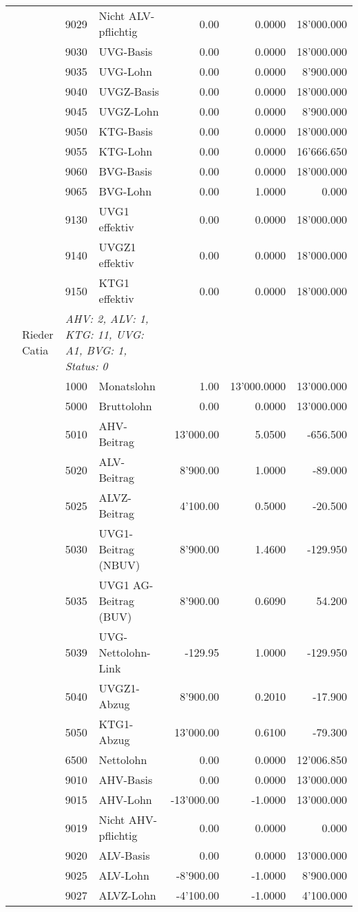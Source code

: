 \documentclass[15pt,a4paper]{article}
\begin{document}
\begin{longtable}{@{\extracolsep{\fill}}l l l l|r|r|r}
&&9029&Nicht ALV-pflichtig&0.00&0.0000&18'000.000\\
&&9030&UVG-Basis&0.00&0.0000&18'000.000\\
&&9035&UVG-Lohn&0.00&0.0000&8'900.000\\
&&9040&UVGZ-Basis&0.00&0.0000&18'000.000\\
&&9045&UVGZ-Lohn&0.00&0.0000&8'900.000\\
&&9050&KTG-Basis&0.00&0.0000&18'000.000\\
&&9055&KTG-Lohn&0.00&0.0000&16'666.650\\
&&9060&BVG-Basis&0.00&0.0000&18'000.000\\
&&9065&BVG-Lohn&0.00&1.0000&0.000\\
&&9130&UVG1 effektiv&0.00&0.0000&18'000.000\\
&&9140&UVGZ1 effektiv&0.00&0.0000&18'000.000\\
&&9150&KTG1 effektiv&0.00&0.0000&18'000.000\\
\pagebreak
23&Rieder Catia&\multicolumn{2}{l|}{\small\emph{AHV: 2, ALV: 1, KTG: 11, UVG: A1, BVG: 1, Status: 0}}&& \\
&&1000&Monatslohn&1.00&13'000.0000&13'000.000\\
&&5000&Bruttolohn&0.00&0.0000&13'000.000\\
&&5010&AHV-Beitrag&13'000.00&5.0500&-656.500\\
&&5020&ALV-Beitrag&8'900.00&1.0000&-89.000\\
&&5025&ALVZ-Beitrag&4'100.00&0.5000&-20.500\\
&&5030&UVG1-Beitrag (NBUV)&8'900.00&1.4600&-129.950\\
&&5035&UVG1 AG-Beitrag (BUV)&8'900.00&0.6090&54.200\\
&&5039&UVG-Nettolohn-Link&-129.95&1.0000&-129.950\\
&&5040&UVGZ1-Abzug&8'900.00&0.2010&-17.900\\
&&5050&KTG1-Abzug&13'000.00&0.6100&-79.300\\
&&6500&Nettolohn&0.00&0.0000&12'006.850\\
&&9010&AHV-Basis&0.00&0.0000&13'000.000\\
&&9015&AHV-Lohn&-13'000.00&-1.0000&13'000.000\\
&&9019&Nicht AHV-pflichtig&0.00&0.0000&0.000\\
&&9020&ALV-Basis&0.00&0.0000&13'000.000\\
&&9025&ALV-Lohn&-8'900.00&-1.0000&8'900.000\\
&&9027&ALVZ-Lohn&-4'100.00&-1.0000&4'100.000\\

\end{longtable}
\end{document}
